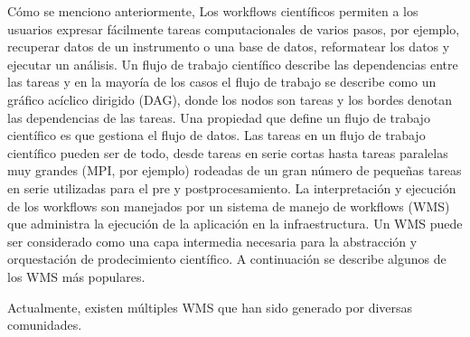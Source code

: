 Cómo se menciono anteriormente, Los workflows científicos permiten a los usuarios expresar fácilmente tareas computacionales de varios pasos, por ejemplo, recuperar datos de un instrumento o una base de datos, reformatear los datos y ejecutar un análisis. 
Un flujo de trabajo científico describe las dependencias entre las tareas y en la mayoría de los casos el flujo de trabajo se describe como un gráfico acíclico dirigido (DAG), donde los nodos son tareas y los bordes denotan las dependencias de las tareas.
Una propiedad que define un flujo de trabajo científico es que gestiona el flujo de datos. Las tareas en un flujo de trabajo científico pueden ser de todo, desde tareas en serie cortas hasta tareas paralelas muy grandes (MPI, por ejemplo) rodeadas de un gran número de pequeñas tareas en serie utilizadas para el pre y postprocesamiento.
La interpretación y ejecución de los workflows son manejados por un sistema de manejo de workflows (WMS) que administra la ejecución de la aplicación en la infraestructura. 
Un WMS puede ser considerado como una capa intermedia necesaria para la abstracción y orquestación de prodecimiento científico. A continuación se describe algunos de los WMS más populares.

Actualmente, existen múltiples WMS que han sido generado por diversas comunidades.

